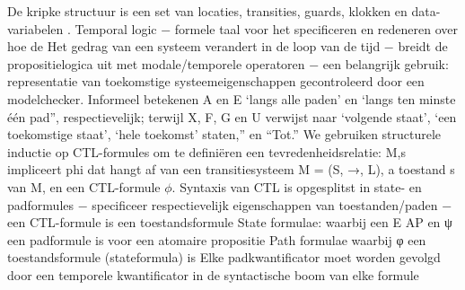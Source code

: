 \documentclass{article}
\begin{document}
	
	De kripke structuur is een set van locaties, transities, guards, klokken en data-variabelen .	
	Temporal logic
	− formele taal voor het specificeren en redeneren over hoe de
	Het gedrag van een systeem verandert in de loop van de tijd
	− breidt de propositielogica uit met modale/temporele operatoren
	− een belangrijk gebruik: representatie van toekomstige systeemeigenschappen
	gecontroleerd door een modelchecker.	
	Informeel betekenen A en E ‘langs alle paden’ en ‘langs
	ten minste één pad”, respectievelijk; terwijl X, F, G en
	U verwijst naar ‘volgende staat’, ‘een toekomstige staat’, ‘hele toekomst’
	staten,” en “Tot.”	
	We gebruiken structurele inductie op CTL-formules om te definiëren
	een tevredenheidsrelatie: M,s impliceert phi
	dat hangt af van een transitiesysteem M = (S, →, L), a
	toestand s van M, en een CTL-formule $\phi$.	
	Syntaxis van CTL is opgesplitst in state- en padformules
	− specificeer respectievelijk eigenschappen van toestanden/paden
	− een CTL-formule is een toestandsformule	
	State formulae: 
	waarbij een E AP en ψ een padformule is voor een atomaire propositie	
	Path formulae 
	waarbij φ een toestandsformule (stateformula) is	
	Elke padkwantificator moet worden gevolgd door een temporele kwantificator in de
	syntactische boom van elke formule
	
\end{document}
